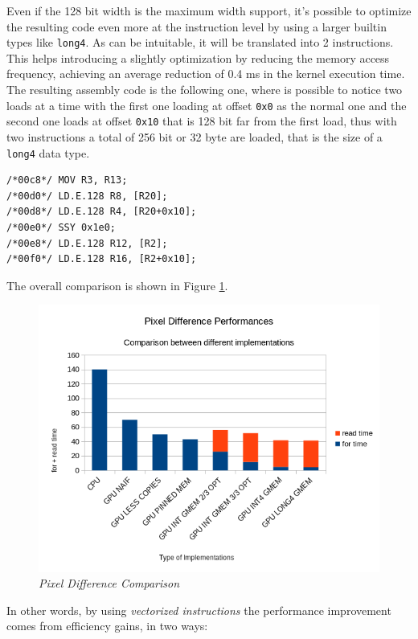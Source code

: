 \documentclass[paper=a4, fontsize=10pt]{scrartcl}	%
\begin{document}
	Even if the 128 bit width is the maximum width support, it's possible to optimize the resulting code even more at the instruction level by using a larger builtin types like \texttt{long4}. As can be intuitable, it will be translated into 2 instructions. This helps introducing a slightly optimization by reducing the memory access frequency, achieving an average reduction of 0.4 ms in the kernel execution time.\\

	The resulting assembly code is the following one, where is possible to notice two loads at a time with the first one loading at offset \texttt{0x0} as the normal one and the second one loads at offset \texttt{0x10} that is 128 bit far from the first load, thus with two instructions a total of 256 bit or 32 byte are loaded, that is the size of a \texttt{long4} data type.
	
	\begin{lstlisting}[style=CStyle]
/*00c8*/ MOV R3, R13;
/*00d0*/ LD.E.128 R8, [R20];
/*00d8*/ LD.E.128 R4, [R20+0x10];
/*00e0*/ SSY 0x1e0;
/*00e8*/ LD.E.128 R12, [R2];
/*00f0*/ LD.E.128 R16, [R2+0x10]; \end{lstlisting}
	
	The overall comparison is shown in Figure \ref{fig:chart6}.

	\begin{figure}[H]
		\centering
		\includegraphics[width=0.9\linewidth]{images/chart6.png}
		\caption{\textit{Pixel Difference Comparison}}
		\label{fig:chart6}
	\end{figure}

	In other words, by using \textit{vectorized instructions} the performance improvement comes from efficiency gains, in two ways:
\end{document}
